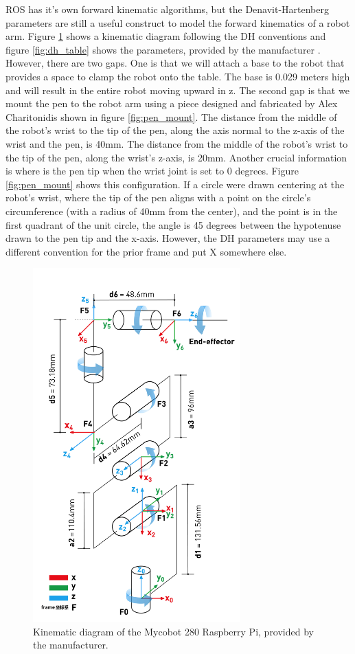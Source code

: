 \documentclass[11pt,a4paper]{article}
\begin{document}
ROS has it's own forward kinematic algorithms, but the Denavit-Hartenberg parameters are still a useful construct \cite{denavit1955kinematic} to model the forward kinematics of a robot arm. Figure \ref{fig:dh_diagram} shows a kinematic diagram following the DH conventions and figure \ref{fig:dh_table} shows the parameters, provided by the manufacturer \cite{er_dh_param}. However, there are two gaps. One is that we will attach a base to the robot that provides a space to clamp the robot onto the table. The base is 0.029 meters high and will result in the entire robot moving upward in z. The second gap is that we mount the pen to the robot arm using a piece designed and fabricated by Alex Charitonidis shown in figure \ref{fig:pen_mount}. The distance from the middle of the robot's wrist to the tip of the pen, along the axis normal to the z-axis of the wrist and the pen, is 40mm. The distance from the middle of the robot's wrist to the tip of the pen, along the wrist's z-axis, is 20mm. Another crucial information is where is the pen tip when the wrist joint is set to 0 degrees. Figure \ref{fig:pen_mount} shows this configuration. If a circle were drawn centering at the robot's wrist, where the tip of the pen aligns with a point on the circle's circumference (with a radius of 40mm from the center), and the point is in the first quadrant of the unit circle, the angle is 45 degrees between the hypotenuse drawn to the pen tip and the x-axis. However, the DH parameters may use a different convention for the prior frame and put X somewhere else. 


\begin{figure}[h]
\includegraphics[width=8cm]{figures/dh_params_manufacturer.jpg}
\centering
\caption{Kinematic diagram of the Mycobot 280 Raspberry Pi, provided by the manufacturer.}
\label{fig:dh_diagram}
\end{figure}
\end{document}

